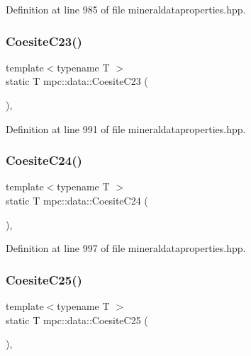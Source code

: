 Definition at line 985 of file mineraldataproperties.\+hpp.

\mbox{\label{namespacempc_1_1data_a20598cffe03dbfa42b6e4c12e9af5580}} 
\subsubsection{\texorpdfstring{Coesite\+C23()}{CoesiteC23()}}
{\footnotesize\ttfamily template$<$typename T $>$ \\
static T mpc\+::data\+::\+Coesite\+C23 (\begin{DoxyParamCaption}{ }\end{DoxyParamCaption})\hspace{0.3cm}{\ttfamily [inline]}, {\ttfamily [static]}}



Definition at line 991 of file mineraldataproperties.\+hpp.

\mbox{\label{namespacempc_1_1data_a71b85a240dac038c5c1839510b9dc8a4}} 
\subsubsection{\texorpdfstring{Coesite\+C24()}{CoesiteC24()}}
{\footnotesize\ttfamily template$<$typename T $>$ \\
static T mpc\+::data\+::\+Coesite\+C24 (\begin{DoxyParamCaption}{ }\end{DoxyParamCaption})\hspace{0.3cm}{\ttfamily [inline]}, {\ttfamily [static]}}



Definition at line 997 of file mineraldataproperties.\+hpp.

\mbox{\label{namespacempc_1_1data_ada4c784f786fd654334514c4f711f427}} 
\subsubsection{\texorpdfstring{Coesite\+C25()}{CoesiteC25()}}
{\footnotesize\ttfamily template$<$typename T $>$ \\
static T mpc\+::data\+::\+Coesite\+C25 (\begin{DoxyParamCaption}{ }\end{DoxyParamCaption})\hspace{0.3cm}{\ttfamily [inline]}, {\ttfamily [static]}}



